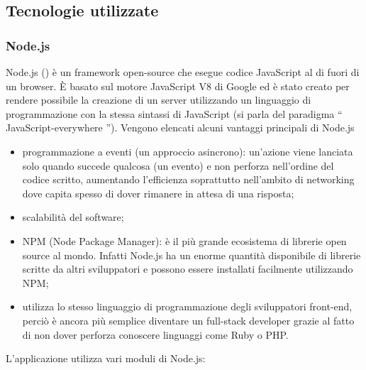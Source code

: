\documentclass[12pt]{report}
\begin{document}
\subsection{Tecnologie utilizzate}

\subsubsection*{Node.js}

Node.js (\cite{nodejs}) è un framework open-source che esegue codice JavaScript al di fuori di un browser. È basato sul motore JavaScript V8 di Google ed è stato creato per rendere possibile la creazione di un server utilizzando un linguaggio di programmazione con la stessa sintassi di JavaScript (si parla del paradigma \textquotedblleft{} JavaScript-everywhere \textquotedblright{}). Vengono elencati alcuni vantaggi principali di Node.js

\begin{itemize}
	\item programmazione a eventi (un approccio asincrono): un'azione viene lanciata solo quando succede qualcosa (un evento) e non perforza nell'ordine del codice scritto, aumentando l'efficienza soprattutto nell'ambito di networking dove capita spesso di dover rimanere in attesa di una risposta;
	\item scalabilità del software;
	\item NPM (Node Package Manager): è il più grande ecosistema di librerie open source al mondo. Infatti Node.js ha un enorme quantità disponibile di librerie scritte da altri sviluppatori e possono essere installati facilmente utilizzando NPM;
	\item utilizza lo stesso linguaggio di programmazione degli sviluppatori front-end, perciò è ancora più semplice diventare un full-stack developer grazie al fatto di non dover perforza conoscere linguaggi come Ruby o PHP.
\end{itemize}
L'applicazione utilizza vari moduli di Node.js:
\end{document}
